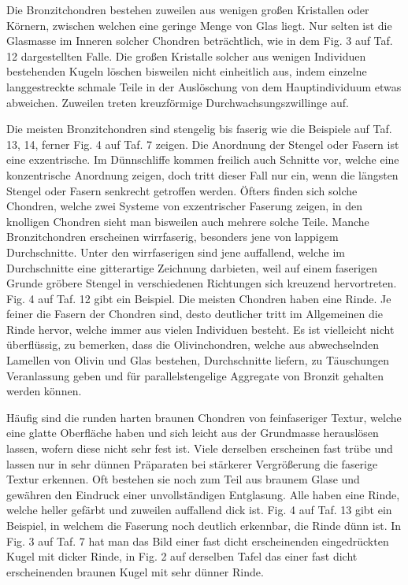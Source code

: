 \documentclass[a4paper, 12pt, oneside]{article}
\begin{document}
Die Bronzitchondren bestehen zuweilen aus wenigen großen Kristallen oder Körnern, zwischen welchen eine geringe Menge von Glas liegt. Nur selten ist die Glasmasse im Inneren solcher Chondren beträchtlich, wie in dem Fig. 3 auf Taf. 12 dargestellten Falle. Die großen Kristalle solcher aus wenigen Individuen bestehenden Kugeln löschen bisweilen nicht einheitlich aus, indem einzelne langgestreckte schmale Teile in der Auslöschung von dem Hauptindividuum etwas abweichen. Zuweilen treten kreuzförmige Durchwachsungszwillinge auf.

Die meisten Bronzitchondren sind stengelig bis faserig wie die Beispiele auf Taf. 13, 14, ferner Fig. 4 auf Taf. 7 zeigen. Die Anordnung der Stengel oder Fasern ist eine exzentrische. Im Dünnschliffe kommen freilich auch Schnitte vor, welche eine konzentrische Anordnung zeigen, doch tritt dieser Fall nur ein, wenn die längsten Stengel oder Fasern senkrecht getroffen werden. Öfters finden sich solche Chondren, welche zwei Systeme von exzentrischer Faserung zeigen, in den knolligen Chondren sieht man bisweilen auch mehrere solche Teile. Manche Bronzitchondren erscheinen wirrfaserig, besonders jene von lappigem Durchschnitte. Unter den wirrfaserigen sind jene auffallend, welche im Durchschnitte eine gitterartige Zeichnung darbieten, weil auf einem faserigen Grunde gröbere Stengel in verschiedenen Richtungen sich kreuzend hervortreten. Fig. 4 auf Taf. 12 gibt ein Beispiel. Die meisten Chondren haben eine Rinde. Je feiner die Fasern der Chondren sind, desto deutlicher tritt im Allgemeinen die Rinde hervor, welche immer aus vielen Individuen besteht. Es ist vielleicht nicht überflüssig, zu bemerken, dass die Olivinchondren, welche aus abwechselnden Lamellen von Olivin und Glas bestehen, Durchschnitte liefern, zu Täuschungen Veranlassung geben und für parallelstengelige Aggregate von Bronzit gehalten werden können.

Häufig sind die runden harten braunen Chondren von feinfaseriger Textur, welche eine glatte Oberfläche haben und sich leicht aus der Grundmasse herauslösen lassen, wofern diese nicht sehr fest ist. Viele derselben erscheinen fast trübe und lassen nur in sehr dünnen Präparaten bei stärkerer Vergrößerung die faserige Textur erkennen. Oft bestehen sie noch zum Teil aus braunem Glase und gewähren den Eindruck einer unvollständigen Entglasung. Alle haben eine Rinde, welche heller gefärbt und zuweilen auffallend dick ist. Fig. 4 auf Taf. 13 gibt ein Beispiel, in welchem die Faserung noch deutlich erkennbar, die Rinde dünn ist. In Fig. 3 auf Taf. 7 hat man das Bild einer fast dicht erscheinenden eingedrückten Kugel mit dicker Rinde, in Fig. 2 auf derselben Tafel das einer fast dicht erscheinenden braunen Kugel mit sehr dünner Rinde.
\end{document}
